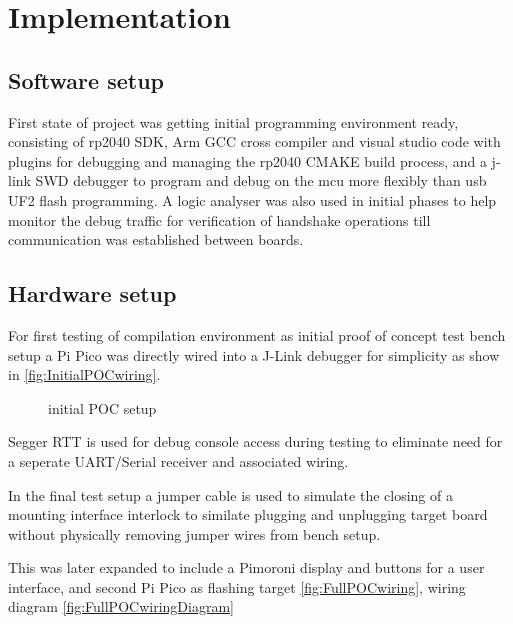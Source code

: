 \clearpage%
\vspace{21.5pt}
\chapter{Implementation}
\section{Software  setup}

First state of project was getting initial programming environment ready, consisting of rp2040 SDK, Arm GCC cross compiler and visual studio code with plugins for debugging and managing the rp2040 CMAKE build process, and a j-link SWD debugger to program and debug on the \gls{mcu} more flexibly than \gls{usb} UF2 flash programming. A logic analyser was also used in initial phases to help monitor the debug traffic for verification of handshake operations till communication was established between boards.
\clearpage
\section{Hardware setup}
%

For first testing of compilation environment as initial proof of concept test bench setup a Pi Pico was directly wired into a J-Link debugger for simplicity as show in \autoref{fig:InitialPOCwiring}.

\begin{figure}[ht]
	\centering
	\caption{initial POC setup}
	\label{fig:InitialPOCwiring}
\end{figure}

Segger RTT\cite{JLinkRTTReal} is used for debug console access during testing to eliminate need for a seperate UART/Serial receiver and associated wiring.

In the final test setup a jumper cable is used to simulate the closing of a mounting interface interlock to similate plugging and unplugging target board without physically removing jumper wires from bench setup.

\pagebreak
This was later expanded to include a Pimoroni display and buttons for a user interface, and second Pi Pico as flashing target \autoref{fig:FullPOCwiring}, wiring diagram \autoref{fig:FullPOCwiringDiagram}

